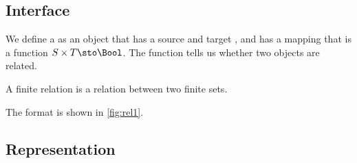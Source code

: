 
\subsection*{Interface}

We define a \Relation as an object that has a source and target \Setoid, and has a mapping that is a function $S \times T \sto \Bool$.
The function tells us whether two objects are related.


A finite relation  is a relation between two finite sets.


The format is shown in \cref{fig:rel1}.

\subsection*{Representation}{}

\begin{marginfigure}
    \caption{}
    \label{fig:rel1}
\end{marginfigure}


